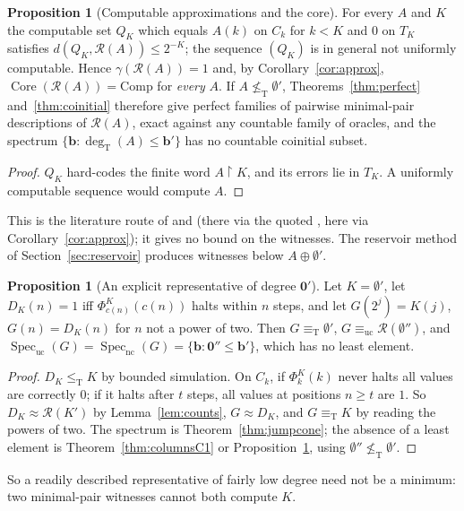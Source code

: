 \documentclass[11pt,letterpaper]{article}
\theoremstyle{definition}
\newtheorem{proposition}[definition]{Proposition}
\numberwithin{equation}{section}
\newcommand{\leT}{\le_{\mathrm T}}
\newcommand{\eqT}{\equiv_{\mathrm T}}
\newcommand{\nleT}{\nleq_{\mathrm T}}
\newcommand{\equc}{\equiv_{\mathrm{uc}}}
\newcommand{\nc}{\mathrm{nc}}
\newcommand{\uc}{\mathrm{uc}}
\newcommand{\Core}{\operatorname{Core}}
\newcommand{\Comp}{\mathrm{Comp}}
\newcommand{\Spec}{\operatorname{Spec}}
\newcommand{\degT}{\deg_{\mathrm T}}
\newcommand{\Rc}{\mathcal R}
\newcommand{\rest}{\mathbin{\upharpoonright}}
\newcommand{\zero}{\mathbf 0}
\newcommand{\src}[1]{\leavevmode{\sffamily\footnotesize\color{Steel}[#1]}}
\newcommand{\rep}[1]{\leavevmode{\sffamily\small\color{Steel}R#1}}
\begin{document}
\begin{proposition}[Computable approximations and the core]\label{prop:gamma}\src{R3, R4}
For every $A$ and $K$ the computable set $Q_K$ which equals $A(k)$ on $C_k$ for $k<K$ and $0$ on $T_K$ satisfies $d(Q_K,\Rc(A))\le2^{-K}$; the sequence $(Q_K)$ is in general not uniformly computable. Hence $\gamma(\Rc(A))=1$ and, by Corollary~\ref{cor:approx}, $\Core(\Rc(A))=\Comp$ for \emph{every} $A$. If $A\nleT\emptyset'$, Theorems~\ref{thm:perfect} and~\ref{thm:coinitial} therefore give perfect families of pairwise minimal-pair descriptions of $\Rc(A)$, exact against any countable family of oracles, and the spectrum $\{\mathbf b:\degT(A)\le\mathbf b'\}$ has no countable coinitial subset.
\end{proposition}
\begin{proof}
$Q_K$ hard-codes the finite word $A\rest K$, and its errors lie in $T_K$. A uniformly computable sequence would compute $A$.
\end{proof}
This is the literature route of \rep3 and \rep4 (there via the quoted \cite[Theorem~4.3]{HJKS}, here via Corollary~\ref{cor:approx}); it gives no bound on the witnesses. The reservoir method of Section~\ref{sec:reservoir} produces witnesses below $A\oplus\emptyset'$.

\begin{proposition}[An explicit representative of degree $\zero'$]\label{prop:G}\src{R4}
Let $K=\emptyset'$, let $D_K(n)=1$ iff $\Phi^K_{c(n)}(c(n))$ halts within $n$ steps, and let $G(2^j)=K(j)$, $G(n)=D_K(n)$ for $n$ not a power of two. Then $G\eqT\emptyset'$, $G\equc\Rc(\emptyset'')$, and $\Spec_{\uc}(G)=\Spec_{\nc}(G)=\{\mathbf b:\zero''\le\mathbf b'\}$, which has no least element.
\end{proposition}
\begin{proof}
$D_K\leT K$ by bounded simulation. On $C_k$, if $\Phi_k^K(k)$ never halts all values are correctly $0$; if it halts after $t$ steps, all values at positions $n\ge t$ are $1$. So $D_K\approx\Rc(K')$ by Lemma~\ref{lem:counts}, $G\approx D_K$, and $G\eqT K$ by reading the powers of two. The spectrum is Theorem~\ref{thm:jumpcone}; the absence of a least element is Theorem~\ref{thm:columnsC1} or Proposition~\ref{prop:gamma}, using $\emptyset''\nleT\emptyset'$.
\end{proof}
So a readily described representative of fairly low degree need not be a minimum: two minimal-pair witnesses cannot both compute $K$.
\end{document}

